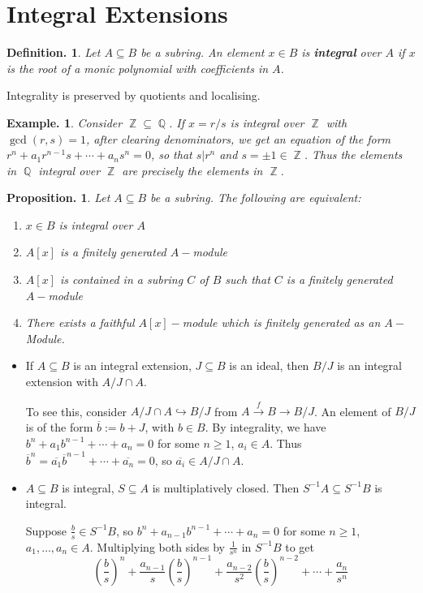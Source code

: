 \documentclass[11pt, a4paper]{memoir}
\DeclareMathOperator{\Q}{{\mathbb{Q}}}
\DeclareMathOperator{\Z}{{\mathbb{Z}}}
\newcommand{\fto}[1]{\ensuremath{\xrightarrow{\scriptstyle{#1}}}}
\theoremstyle{change}
\newtheorem{proposition}[theorem]{Proposition.}
\theoremstyle{plain}
\theoremstyle{nonumberplain}
\newtheorem{definition}{Definition.}
\newtheorem{example}{Example.}
\numberwithin{equation}{section}
\begin{document}
\section{Integral Extensions}
\begin{definition}
    Let $A\subseteq B$ be a subring.
    An element $x\in B$ is \textbf{integral} over $A$ if $x$ is the root of a monic polynomial with coefficients in $A$.
\end{definition}
Integrality is preserved by quotients and localising.
\begin{example}
    Consider $\Z\subseteq\Q$.
    If $x=r/s$ is integral over $\Z$ with $\gcd(r,s)=1$, after clearing denominators, we get an equation of the form $r^n+a_1r^{n-1}s+\cdots+a_ns^n=0$, so that $s|r^n$ and $s=\pm 1\in\Z$.
    Thus the elements in $\Q$ integral over $\Z$ are precisely the elements in $\Z$.
\end{example}
\begin{proposition}
    Let $A\subseteq B$ be a subring.
    The following are equivalent:
    \begin{enumerate}[nl,r]
        \item $x\in B$ is integral over $A$
        \item $A[x]$ is a finitely generated $A-$module
        \item $A[x]$ is contained in a subring $C$ of $B$ such that $C$ is a finitely generated $A-$module
        \item There exists a faithful $A[x]-$module which is finitely generated as an $A-$Module.
    \end{enumerate}

\end{proposition}
\begin{itemize}[nl]
    \item If $A\subseteq B$ is an integral extension, $J\subseteq B$ is an ideal, then $B/J$ is an integral extension with $A/J\cap A$.

        To see this, consider $A/J\cap A\hookrightarrow B/J$ from $A\fto{f} B\to B/J$.
        An element of $B/J$ is of the form $\overline{b}:= b+J$, with $b\in B$.
        By integrality, we have $b^n+a_1b^{n-1}+\cdots+a_n=0$ for some $n\geq 1$, $a_i\in A$.
        Thus $\overline{b}^n=\overline{a_1}\overline{b}^{n-1}+\cdots+\overline{a_n}=0$, so $\overline{a_i}\in A/J\cap A$.
    \item $A\subseteq B$ is integral, $S\subseteq A$ is multiplatively closed.
        Then $S^{-1}A\subseteq S^{-1}B$ is integral.

        Suppose $\frac{b}{s}\in S^{-1}B$, so $b^n+a_{n-1}b^{n-1}+\cdots+a_n=0$ for some $n\geq 1$, $a_1,\ldots,a_n\in A$.
        Multiplying both sides by $\frac{1}{s^n}$ in $S^{-1}B$ to get
        \begin{equation*}
            \left(\frac{b}{s}\right)^n+\frac{a_{n-1}}{s}\left(\frac{b}{s}\right)^{n-1}+\frac{a_{n-2}}{s^2}\left(\frac{b}{s}\right)^{n-2}+\cdots+\frac{a_n}{s^n}
        \end{equation*}
\end{itemize}
\end{document}
